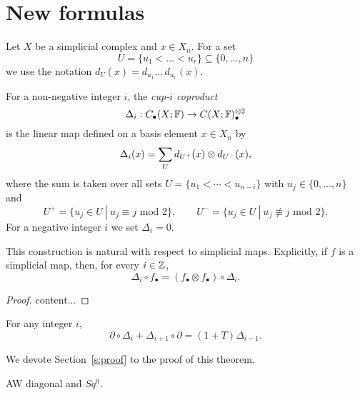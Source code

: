
\section{New formulas} \label{s:new formulas}

Let $X$ be a simplicial complex and $x \in X_n$. For a set
\begin{equation*}
U = \{u_1 < \dots < u_r\} \subseteq \{0, \dots, n\}
\end{equation*}
we use the notation $d_U(x) = d_{u_1} \ldots\, d_{u_r}(x)$.

\begin{definition} \label{d:cup-i coproducts}	
	For a non-negative integer $i$, the \textit{cup-$i$ coproduct}
	\begin{equation*}
	\Delta_i : C_\bullet(X; \mathbb{F}) \to C(X; \mathbb{F})^{\otimes 2}_\bullet
	\end{equation*}
	is the linear map defined on a basis element $x \in X_n$ by
	\begin{equation} \label{equation: simplicial cup-i coproducts}
	\Delta_i(x) = \sum_U d_{U^+}(x) \otimes d_{U^-}(x),
	\end{equation}
	where the sum is taken over all sets $U = \{u_1 < \cdots < u_{n-i}\}$ with $u_j \in \{0, \dots, n\}$ and
	\begin{equation*}
	U^+ = \{u_j \in U\ |\ u_j \equiv j \text{ mod } 2\}, \qquad
	U^- = \{u_j \in U\ |\ u_j \not\equiv j \text{ mod } 2\}.
	\end{equation*}
	For a negative integer $i$ we set $\Delta_i = 0$.
\end{definition}

\begin{lemma}
	This construction is natural with respect to simplicial maps.
	Explicitly, if $f$ is a simplicial map, then, for every $i \in \mathbb{Z}$,
	\begin{equation*}
	\Delta_i \circ f_\bullet = (f_\bullet \otimes f_\bullet) \circ \Delta_i.
	\end{equation*}
\end{lemma}

\begin{proof}
	content...
\end{proof}

\begin{theorem} \label{t:main}
	For any integer $i$,
	\begin{equation} \label{eq: cup-i coproducts boundary relation}
	\partial \circ \Delta_{i} + \Delta_{i+1} \circ \partial = (1 +T ) \Delta_{i-1}.
	\end{equation}
\end{theorem}

We devote Section~\ref{s:proof} to the proof of this theorem.

\begin{example}
	AW diagonal and $Sq^0$.
\end{example}